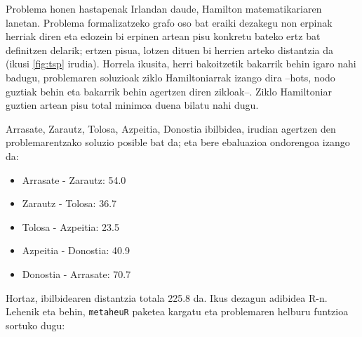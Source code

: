 \documentclass[eu]{ifirak}\usepackage[]{graphicx}\usepackage[]{color}
\newcommand{\code}[1]{\texttt{#1}}
\begin{document}
Problema honen hastapenak Irlandan daude, Hamilton matematikariaren lanetan. Problema formalizatzeko grafo oso bat eraiki dezakegu non erpinak herriak diren eta edozein bi erpinen artean pisu konkretu bateko ertz bat definitzen delarik; ertzen pisua, lotzen dituen bi herrien arteko distantzia da (ikusi \ref{fig:tsp} irudia). Horrela ikusita, herri bakoitzetik bakarrik behin igaro nahi badugu, problemaren soluzioak ziklo Hamiltoniarrak izango dira --hots, nodo guztiak behin eta bakarrik behin agertzen diren zikloak--. Ziklo Hamiltoniar guztien artean pisu total minimoa duena bilatu nahi dugu. 

Arrasate, Zarautz, Tolosa, Azpeitia, Donostia ibilbidea, irudian agertzen den problemarentzako soluzio posible bat da; eta bere ebaluazioa ondorengoa izango da:

\begin{itemize}
\item Arrasate - Zarautz: 54.0
\item Zarautz - Tolosa: 36.7
\item Tolosa - Azpeitia: 23.5
\item Azpeitia - Donostia: 40.9
\item Donostia - Arrasate: 70.7
\end{itemize}

Hortaz, ibilbidearen distantzia totala 225.8 da. Ikus dezagun adibidea R-n. Lehenik eta behin, \code{metaheuR} paketea kargatu eta problemaren helburu funtzioa sortuko dugu:
\end{document}
